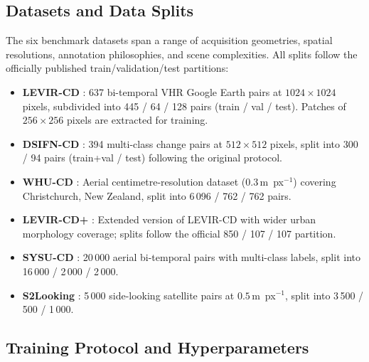\subsection{Datasets and Data Splits}

The six benchmark datasets span a range of acquisition geometries, spatial
resolutions, annotation philosophies, and scene complexities. All splits follow
the officially published train/validation/test partitions:
\begin{itemize}
    \item \textbf{LEVIR-CD} \cite{Zheng2020LEVIR}: 637 bi-temporal \ac{VHR}
          Google Earth pairs at $1024 \times 1024$ pixels, subdivided into
          445 / 64 / 128 pairs (train / val / test). Patches of
          $256 \times 256$ pixels are extracted for training.
    \item \textbf{DSIFN-CD} \cite{Zhang2020FusionNetDSIFN}: 394 multi-class
          change pairs at $512 \times 512$ pixels, split into 300 / 94 pairs
          (train+val / test) following the original protocol.
    \item \textbf{WHU-CD} \cite{Ji2019WHU}: Aerial centimetre-resolution dataset
          ($0.3\,\mathrm{m}$~px$^{-1}$) covering Christchurch, New Zealand,
          split into 6\,096 / 762 / 762 pairs.
    \item \textbf{LEVIR-CD+} \cite{LevirCDPlus}: Extended version of LEVIR-CD
          with wider urban morphology coverage; splits follow the official
          850 / 107 / 107 partition.
    \item \textbf{SYSU-CD} \cite{ShiSYSU2022}: 20\,000 aerial bi-temporal pairs
          with multi-class labels, split into 16\,000 / 2\,000 / 2\,000.
    \item \textbf{S2Looking} \cite{ShenS2Looking2021}: 5\,000 side-looking
          satellite pairs at $0.5\,\mathrm{m}$~px$^{-1}$, split into
          3\,500 / 500 / 1\,000.
\end{itemize}

\subsection{Training Protocol and Hyperparameters}

